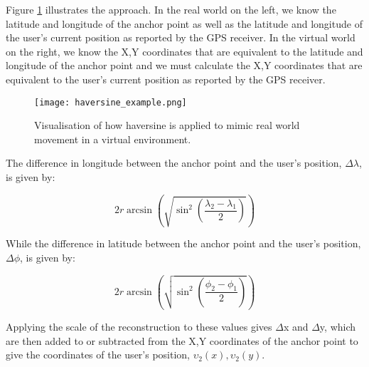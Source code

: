 Figure \ref{haversine_example.png} illustrates the approach. In the real world on the left, we know the latitude and longitude of the anchor point as well as the latitude and longitude of the user's current position as reported by the GPS receiver. In the virtual world on the right, we know the X,Y coordinates that are equivalent to the latitude and longitude of the anchor point and we must calculate the X,Y coordinates that are equivalent to the user's current position as reported by the GPS receiver.

\begin{figure}[h]
\centering
  \texttt{[image: haversine\_example.png]}
  \caption{Visualisation of how haversine is applied to mimic real world movement in a virtual environment.}
  \label{haversine_example.png}
\end{figure}

The difference in longitude between the anchor point and the user's position, $\Delta\lambda$, is given by:

\begin{equation}
2r \arcsin\left( \sqrt{\sin^{2} \left( \frac{\lambda_{2} - \lambda_{1}}{2} \right) } \right)
\end{equation}

While the difference in latitude between the anchor point and the user's position, $\Delta\phi$, is given by:

\begin{equation}
2r \arcsin\left( \sqrt{\sin^{2} \left( \frac{\phi_{2} - \phi_{1}}{2}\right)} \right)
\end{equation}

Applying the scale of the reconstruction to these values gives $\Delta$x and $\Delta$y, which are then added to or subtracted from the X,Y coordinates of the anchor point to give the coordinates of the user's position, $\upsilon_{2}(x),\upsilon_{2}(y)$.


